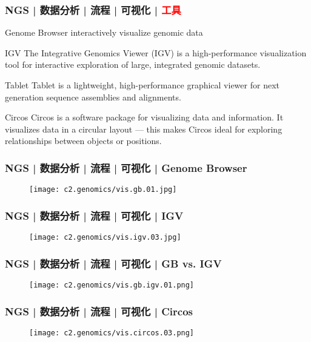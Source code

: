 \begin{frame}
  \frametitle{NGS | 数据分析 | 流程 | 可视化 | \textcolor{red}{工具}}
  \begin{block}{Genome Browser}
    interactively visualize genomic data
  \end{block}
  \pause
  \begin{block}{IGV}
    The Integrative Genomics Viewer (IGV) is a high-performance visualization tool for interactive exploration of large, integrated genomic datasets.
  \end{block}
  \pause
  \begin{block}{Tablet}
    Tablet is a lightweight, high-performance graphical viewer for next generation sequence assemblies and alignments.
  \end{block}
  \pause
  \begin{block}{Circos}
    Circos is a software package for visualizing data and information. It visualizes data in a circular layout --- this makes Circos ideal for exploring relationships between objects or positions.
  \end{block}
\end{frame}

\begin{frame}
  \frametitle{NGS | 数据分析 | 流程 | 可视化 | Genome Browser}
  \begin{figure}
    \centering
    \texttt{[image: c2.genomics/vis.gb.01.jpg]}
  \end{figure}
\end{frame}

\begin{frame}
  \frametitle{NGS | 数据分析 | 流程 | 可视化 | IGV}
  \begin{figure}
    \centering
    \texttt{[image: c2.genomics/vis.igv.03.jpg]}
  \end{figure}
\end{frame}

\begin{frame}
  \frametitle{NGS | 数据分析 | 流程 | 可视化 | GB vs. IGV}
  \begin{figure}
    \centering
    \texttt{[image: c2.genomics/vis.gb.igv.01.png]}
  \end{figure}
\end{frame}

\begin{frame}
  \frametitle{NGS | 数据分析 | 流程 | 可视化 | Circos}
  \begin{figure}
    \centering
    \texttt{[image: c2.genomics/vis.circos.03.png]}
  \end{figure}
\end{frame}

